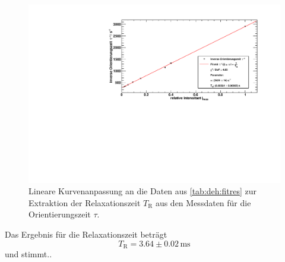 \begin{figure}[H]
\begin{center}
  \includegraphics[width=\textwidth]{../img/part5/taufit.pdf}
  \caption{Lineare Kurvenanpassung an die Daten aus \autoref{tab:deh:fitres} zur Extraktion
  der Relaxationszeit $T_\text{R}$ aus den Messdaten für die Orientierungszeit $\tau$.}
  \label{img:deh:relaxtime}
\end{center}
\end{figure}

Das Ergebnis für die Relaxationszeit beträgt
\begin{equation}
  T_\text{R} = 3.64 \pm 0.02\,\text{ms}
\end{equation}
und stimmt..



